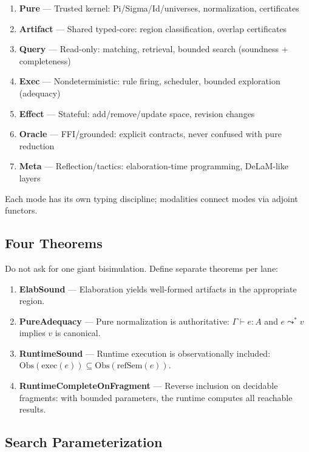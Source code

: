 \documentclass[11pt]{article}
\begin{document}
\begin{enumerate}
\item \textbf{Pure} --- Trusted kernel: Pi/Sigma/Id/universes, normalization, certificates
\item \textbf{Artifact} --- Shared typed-core: region classification, overlap certificates
\item \textbf{Query} --- Read-only: matching, retrieval, bounded search (soundness + completeness)
\item \textbf{Exec} --- Nondeterministic: rule firing, scheduler, bounded exploration (adequacy)
\item \textbf{Effect} --- Stateful: add/remove/update space, revision changes
\item \textbf{Oracle} --- FFI/grounded: explicit contracts, never confused with pure reduction
\item \textbf{Meta} --- Reflection/tactics: elaboration-time programming, DeLaM-like layers
\end{enumerate}

Each mode has its own typing discipline; modalities connect modes via
adjoint functors.

\subsection{Four Theorems}

Do not ask for one giant bisimulation.  Define separate theorems per lane:

\begin{enumerate}
\item \textbf{ElabSound} --- Elaboration yields well-formed artifacts in the
      appropriate region.
\item \textbf{PureAdequacy} --- Pure normalization is authoritative:
      $\Gamma \vdash e : A$ and $e \leadsto^* v$ implies $v$ is canonical.
\item \textbf{RuntimeSound} --- Runtime execution is observationally included:
      $\mathrm{Obs}(\mathrm{exec}(e)) \subseteq \mathrm{Obs}(\mathrm{refSem}(e))$.
\item \textbf{RuntimeCompleteOnFragment} --- Reverse inclusion on decidable fragments:
      with bounded parameters, the runtime computes all reachable results.
\end{enumerate}

\subsection{Search Parameterization}
\end{document}
